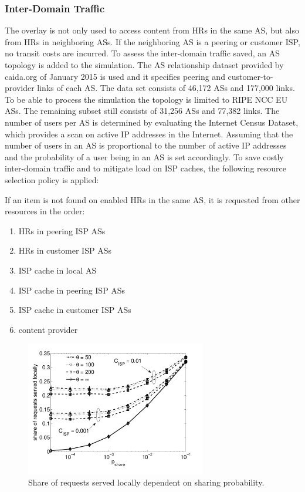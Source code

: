\subsubsection{Inter-Domain Traffic}

The overlay is not only used to access content from HRs in the same AS, but also from HRs in neighboring ASs. If the neighboring AS is a peering or customer ISP, no transit costs are incurred.
To assess the inter-domain traffic saved, an AS topology is added to the simulation. The AS relationship dataset provided by caida.org\cite{caida2015} of January 2015 is used and it specifies peering and customer-to-provider links of each AS. The data set consists of 46,172 ASs and 177,000 links.
To be able to process the simulation the topology is limited to RIPE NCC EU ASs. The remaining subset still consists of 31,256 ASs and 77,382 links.
The number of users per AS is determined by evaluating the Internet Census Dataset\cite{carna2013}, which provides a scan on active IP addresses in the Internet. Assuming that the number of users in an AS is proportional to the number of active IP addresses and the probability of a user being in an AS is set accordingly.
To save costly inter-domain traffic and to mitigate load on ISP caches, the following resource selection policy is applied:

If an item is not found on enabled HRs in the same AS, it is requested from other resources in the order:
\begin{enumerate}
	\itemsep0em
	\item HRs in peering ISP ASs
	\item HRs in customer ISP ASs
	\item ISP cache in local AS
	\item ISP cache in peering ISP ASs
	\item ISP cache in customer ISP ASs
	\item content provider
\end{enumerate}

\begin{figure}[tb]
  \centering
  \includegraphics[width=0.7\textwidth]{hierarchical/simulative/figures/RBHlocal3}
  \caption{Share of requests served locally dependent on sharing probability.}
  \label{fig:RBHlocal}
\end{figure}

